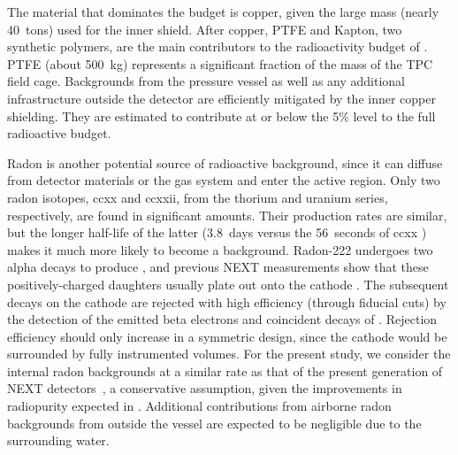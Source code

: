 
The material that dominates the budget is copper, given the large mass (nearly 40~tons) used for the inner shield. 
After copper, PTFE and Kapton, two synthetic polymers, are the main contributors to the radioactivity budget of \NHD. PTFE (about \SI{500}{kg}) represents a significant fraction of the mass of the TPC field cage. Backgrounds from the pressure vessel as well as any additional infrastructure outside the detector are efficiently mitigated by the inner copper shielding. They are estimated to contribute at or below the 5\% level to the full radioactive budget. 




Radon is another potential source of radioactive background, since it can diffuse from detector materials or the gas system and enter the active region. Only two radon isotopes, \Rn{220} and \Rn{222}, from the thorium and uranium series, respectively, are found in significant amounts. Their production rates are similar, but the longer half-life of the latter (3.8~days versus the 56~seconds of \Rn{220} \cite{nudat}) makes it much more likely to become a background. Radon-222 undergoes two alpha decays to produce , and previous NEXT measurements show that these positively-charged daughters usually plate out onto the cathode \cite{Novella:2018ewv}. The subsequent  decays on the cathode are rejected with high efficiency (through fiducial cuts) by the detection of the emitted beta electrons and coincident decays of . Rejection efficiency should only increase in a symmetric design, since the cathode would be surrounded by fully instrumented volumes. For the present study, we consider the internal radon backgrounds at a similar rate as that of the present generation of NEXT detectors~\cite{Novella:2018ewv}, a conservative assumption, given the improvements in radiopurity expected in \NHD. Additional contributions from airborne radon backgrounds from outside the vessel are expected to be negligible due to the surrounding water.

